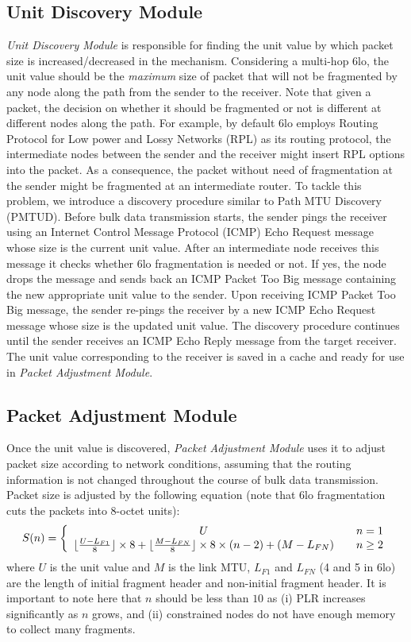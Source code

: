 \documentclass[runningheads,a4paper]{llncs}
\begin{document}
\subsection{Unit Discovery Module}
\emph{Unit Discovery Module} is responsible for finding the unit value by which packet size is increased/decreased in the mechanism. Considering a multi-hop 6lo, the unit value should be the \emph{maximum} size of packet that will not be fragmented by any node along the path from the sender to the receiver. Note that given a packet, the decision on whether it should be fragmented or not is different at different nodes along the path. For example, by default 6lo employs Routing Protocol for Low power and Lossy Networks (RPL) as its routing protocol, the intermediate nodes between the sender and the receiver might insert RPL options into the packet. As a consequence, the packet without need of fragmentation at the sender might be fragmented at an intermediate router. To tackle this problem, we introduce a discovery procedure similar to Path MTU Discovery (PMTUD). Before bulk data transmission starts, the sender pings the receiver using an Internet Control Message Protocol (ICMP) Echo Request message whose size is the current unit value. After an intermediate node receives this message it checks whether 6lo fragmentation is needed or not. If yes, the node drops the message and sends back an ICMP Packet Too Big message containing the new appropriate unit value to the sender. Upon receiving ICMP Packet Too Big message, the sender re-pings the receiver by a new ICMP Echo Request message whose size is the updated unit value. The discovery procedure continues until the sender receives an ICMP Echo Reply message from the target receiver. The unit value corresponding to the receiver is saved in a cache and ready for use in \emph{Packet Adjustment Module}.

\subsection{Packet Adjustment Module} \label{sec:pa}
Once the unit value is discovered, \emph{Packet Adjustment Module} uses it to adjust packet size according to network conditions, assuming that the routing information is not changed throughout the course of bulk data transmission. Packet size is adjusted by the following equation (note that 6lo fragmentation cuts the packets into 8-octet units):
\begin{equation} \label{eq:size}
S(n) = \left\{
  \begin{array}{c l}
    U & \quad n=1 \\
    \lfloor \frac{U-L_{F1}}{8} \rfloor \times 8 + \lfloor \frac{M-L_{FN}}{8} \rfloor \times 8 \times (n-2) + (M-L_{FN}) & \quad n \ge 2
  \end{array}
\right.
\end{equation}
where $U$ is the unit value and $M$ is the link MTU, $L_{F1}$ and $L_{FN}$ (4 and 5 in 6lo) are the length of initial fragment header and non-initial fragment header. It is important to note here that $n$ should be less than $10$ as (i) PLR  increases significantly as $n$ grows, and (ii) constrained nodes do not have enough memory to collect many fragments.
\end{document}
